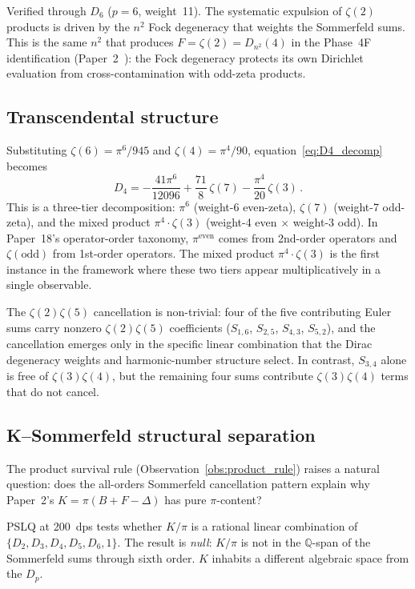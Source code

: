 \documentclass[11pt]{article}
\begin{document}
Verified through $D_6$ ($p = 6$, weight~11).  The systematic expulsion
of $\zeta(2)$ products is driven by the $n^2$ Fock degeneracy that
weights the Sommerfeld sums.  This is the same $n^2$ that produces
$F = \zeta(2) = D_{n^2}(4)$ in the Phase~4F identification
(Paper~2~\cite{paper2}): the Fock degeneracy protects its own Dirichlet
evaluation from cross-contamination with odd-zeta products.

\subsection{Transcendental structure}

Substituting $\zeta(6) = \pi^6/945$ and $\zeta(4) = \pi^4/90$,
equation~\eqref{eq:D4_decomp} becomes
\begin{equation}
\label{eq:D4_three_tier}
  D_4 = -\frac{41\pi^6}{12096}
  + \frac{71}{8}\,\zeta(7)
  - \frac{\pi^4}{20}\,\zeta(3)\,.
\end{equation}
This is a three-tier decomposition: $\pi^6$ (weight-6 even-zeta),
$\zeta(7)$ (weight-7 odd-zeta), and the mixed product
$\pi^4 \cdot \zeta(3)$ (weight-4 even $\times$ weight-3 odd).
In Paper~18's operator-order taxonomy, $\pi^{\mathrm{even}}$ comes
from 2nd-order operators and $\zeta(\mathrm{odd})$ from 1st-order
operators.  The mixed product $\pi^4 \cdot \zeta(3)$ is the first
instance in the framework where these two tiers appear multiplicatively
in a single observable.

The $\zeta(2)\zeta(5)$ cancellation is non-trivial: four of the five
contributing Euler sums carry nonzero $\zeta(2)\zeta(5)$ coefficients
($S_{1,6}$, $S_{2,5}$, $S_{4,3}$, $S_{5,2}$), and the cancellation
emerges only in the specific linear combination that the Dirac
degeneracy weights and harmonic-number structure select.  In contrast,
$S_{3,4}$ alone is free of $\zeta(3)\zeta(4)$, but the remaining four
sums contribute $\zeta(3)\zeta(4)$ terms that do not cancel.

\subsection{K--Sommerfeld structural separation}

The product survival rule
(Observation~\ref{obs:product_rule}) raises a natural question: does the
all-orders Sommerfeld cancellation pattern explain why Paper~2's
$K = \pi(B + F - \Delta)$ has pure $\pi$-content?

PSLQ at 200~dps tests whether $K/\pi$ is a rational linear combination
of $\{D_2, D_3, D_4, D_5, D_6, 1\}$.  The result is \emph{null}: $K/\pi$ is
not in the $\mathbb{Q}$-span of the Sommerfeld sums through sixth order.
$K$ inhabits a different algebraic space from the $D_p$.
\end{document}
